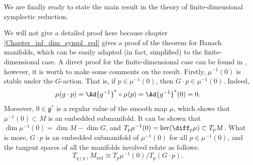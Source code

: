 We are finally ready to state the main result in the theory of finite-dimensional symplectic reduction.

We will not give a detailed proof here because chapter \ref{Chapter_inf_dim_sympl_red} gives a proof of the theorem for Banach manifolds, which can be easily adapted (in fact, simplified) to the finite-dimensional case. A direct proof for the finite-dimensional case can be found in \parencite[Part. IX]{da2001lectures}, however, it is worth to make some comments on the result. Firstly, \(\mu^{-1}(0)\) is stable under the \(G\)-action. That is, if \(p \in \mu^{-1}(0)\), then \(G \cdot p \in \mu^{-1}(0)\). Indeed, 
\begin{equation} \label{eq_mu_invariant_G_action}
\mu(g \cdot p)=\Ad{g^{-1}}^* \circ \mu(p)=\Ad{g^{-1}}^*(0)=0.
\end{equation}
Moreover, \(0 \in \mathfrak{g}^*\) is a regular value of the smooth map \(\mu\), which shows that \(\mu^{-1}(0) \subset M\) is an embedded submanifold. It can be shown that \(\dim \mu^{-1}(0)=\dim M - \dim G\), and \(T_p\mu^{-1}(0)=\ker (\diff_p\mu) \subset T_pM\). What is more, \(G \cdot p\) is an embedded submanifold of \(\mu^{-1}(0)\) for all \(p \in \mu^{-1}(0)\), and the tangent spaces of all the manifolds involved relate as follows:
\[
T_{q(p)} M_{\mathrm{red}} \cong T_p\mu^{-1}(0)/T_p(G \cdot p).
\]


